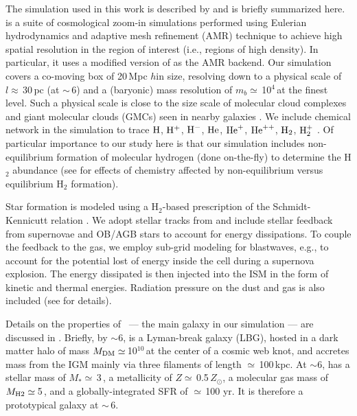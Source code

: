 \IfFileExists{emulateapjlegacy.cls}{\documentclass[iop]{emulateapjlegacy}}{\documentclass[iop]{emulateapj}}
\begin{document}
The simulation used in this work is described by \citealt{Pallottini17a, Pallottini17b} and is briefly summarized here.
%
 is a suite of cosmological zoom-in simulations performed using Eulerian hydrodynamics and adaptive mesh refinement (AMR) technique to achieve high spatial resolution in the region of interest (i.e., regions of high density).
%
In particular, it uses a modified version of  \citep{Teyssier2002a} as the AMR backend. Our simulation covers a co-moving box of 20\,Mpc $h$\pmOne in size, resolving down to a physical scale of $l\approx$\,30\,pc (at \z$\sim$\,6) and a (baryonic) mass resolution of $m_b\simeq$\,10$^4$\,\Msun at the finest level. Such a physical scale is close to the size scale of molecular cloud complexes and giant molecular clouds (GMCs) seen in nearby galaxies \citep[e.g.,][]{Sanders85a, Federrath13a, Goodman14a}.
%
We include chemical network in the simulation to trace $\rm{H}$, $\rm{H}^{+}$, $\rm{H}^{-}$, $\rm{He}$, $\rm{He}^{+}$, $\rm{He}^{++}$, $\rm{H}_2$, $\rm{H}_2^{+}$ \citep{Grassi14a,Bovino16a}. Of particular importance to our study here is that our simulation includes non-equilibrium formation of molecular hydrogen (done on-the-fly) to determine the H$_2$ abundance (see \citealt{Pallottini17b} for effects of chemistry affected by non-equilibrium versus equilibrium H$_2$ formation).

Star formation is modeled using a H$_2$-based prescription of the Schmidt-Kennicutt relation \citep{Krumholz09a}. We adopt stellar tracks from  and include stellar feedback from supernovae and OB/AGB stars to account for energy dissipations. To couple the feedback to the gas, we employ sub-grid modeling for blastwaves, e.g., to account for the potential lost of energy inside the cell during a supernova explosion. The energy dissipated is then injected into the ISM in the form of kinetic and thermal energies. Radiation pressure on the dust and gas is also included (see \citealt{Pallottini17a} for details).

Details on the properties of \flower\ --- the main galaxy in our simulation --- are discussed in \citet{Pallottini17b}. Briefly, by \z$\sim$6, \flower is a Lyman-break galaxy (LBG), hosted in a dark matter halo of mass $M_{\rm DM}\simeq$\,10$^{10}$\,\Msun at the center of a cosmic web knot, and accretes mass from the IGM mainly via three filaments of length $\simeq$\,100\,kpc. At \z$\sim$6, \flower has a stellar mass of $M_*\simeq$\,3\,\Msun, a metallicity of $Z\simeq$\,0.5\,$Z_{\odot}$, a molecular gas mass of $M_{\rm H2}\simeq$\,5\,\Msun, and a globally-integrated SFR of $\simeq$\,100\,\Msun\,yr\pmOne. It is therefore a prototypical galaxy at \z$\sim$\,6.
\end{document}
